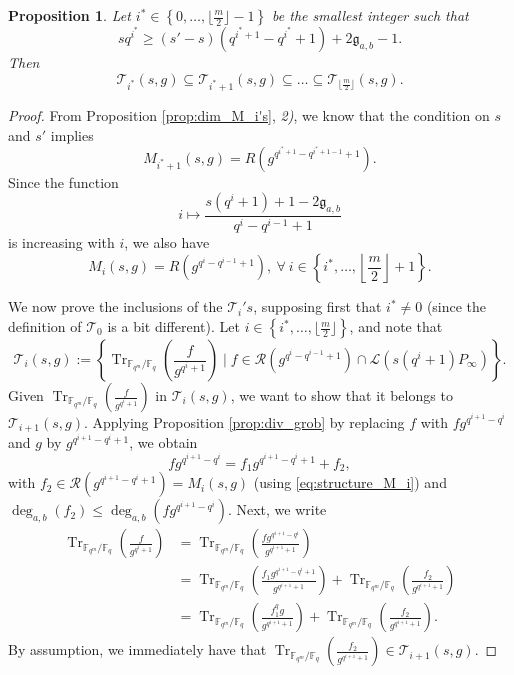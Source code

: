 \documentclass[a4paper]{article}
\newtheorem{proposition}[thm]{Proposition}
\theoremstyle{definition}
\theoremstyle{remark}
\newcommand{\calL}{\mathcal{L}}
\newcommand{\calR}{\mathcal{R}}
\newcommand{\calT}{\mathcal{T}}
\newcommand{\fq}{\mathbb{F}_{q}}
\newcommand{\Tr}[1]{\operatorname{Tr}_{\mathbb{F}_{q^m}/\fq}\left(#1\right)}
\newcommand{\set}[1]{\left\{#1\right\}}
\newcommand{\degab}[1]{\deg_{a,b}\left(#1\right)}
\begin{document}
\begin{proposition} \label{prop:inclusion_T_i's} Let $i^* \in \set{0,\dots,\lfloor\frac{m}{2}\rfloor-1}$ be the smallest integer such that 
$$sq^{i^*} \geq (s'-s)(q^{i^*+1}-q^{i^{*}}+1)+2\mathfrak{g}_{a,b}-1.$$ 
Then
$$\calT_{i^*}(s,g) \subseteq \calT_{i^*+1}(s,g) \subseteq \dots \subseteq \calT_{\lfloor \frac{m}{2}\rfloor}(s,g).$$
\end{proposition}

\begin{proof}
From Proposition \ref{prop:dim_M_i's}, \textit{2)}, we know that the condition on $s$ and $s'$ implies $$M_{i^*+1}(s,g) = R(g^{q^{i^*+1}-q^{i^*+1-1}+1}).$$ 
Since the function $$i \mapsto \dfrac{s(q^i+1)+1-2\mathfrak{g}_{a,b}}{q^i-q^{i-1}+1}$$ 
is increasing with $i$, we also have
\begin{equation} \label{eq:structure_M_i}
M_{i}(s,g) = R(g^{q^{i}-q^{i-1}+1}), \ \forall \ i \in \set{i^*,\dots,\left\lfloor \frac{m}{2}\right\rfloor+1}.
\end{equation} 

We now prove the inclusions of the $\calT_i's$, supposing first that $i^* \neq 0$ (since the definition of $\calT_0$ is a bit different). Let $i \in \set{i^*,\dots,\lfloor \frac{m}{2} \rfloor}$, and note that 
$$\calT_i(s,g) := \set{\Tr{\frac{f}{g^{q^i+1}}} \mid f \in \calR(g^{q^i-q^{i-1}+1})\cap \calL(s(q^i+1)P_\infty)}.$$
Given $\Tr{\frac{f}{g^{q^i+1}}}$ in $\calT_i(s,g)$, we want to show that it belongs to $\calT_{i+1}(s,g)$. Applying Proposition \ref{prop:div_grob} by replacing $f$ with $fg^{q^{i+1}-q^i}$ and $g$ by $g^{q^{i+1}-q^i+1}$, we obtain
\begin{equation} \label{eq:division_i}
fg^{q^{i+1}-q^i} = f_1g^{q^{i+1}-q^i+1} + f_2,
\end{equation}
with $f_2 \in \calR(g^{q^{i+1}-q^i+1}) = M_i(s,g)$ (using \eqref{eq:structure_M_i}) and $\degab{f_2} \leq \degab{fg^{q^{i+1}-q^i}}$. Next, we write
\begin{align*}
    \Tr{\frac{f}{g^{q^i+1}}} &= \Tr{\frac{fg^{q^{i+1}-q^i}}{g^{q^{i+1}+1}}} \\
                             &= \Tr{\frac{f_1g^{q^{i+1}-q^i+1}}{g^{q^{i+1}+1}}} + \Tr{\frac{f_2}{g^{q^{i+1}+1}}} \\
                             &= \Tr{\frac{f_1^qg}{g^{q^{i+1}+1}}} + \Tr{\frac{f_2}{g^{q^{i+1}+1}}}.
\end{align*}
By assumption, we immediately have that $\Tr{\frac{f_2}{g^{q^{i+1}+1}}} \in \calT_{i+1}(s,g).$


\end{proof}
\end{document}
